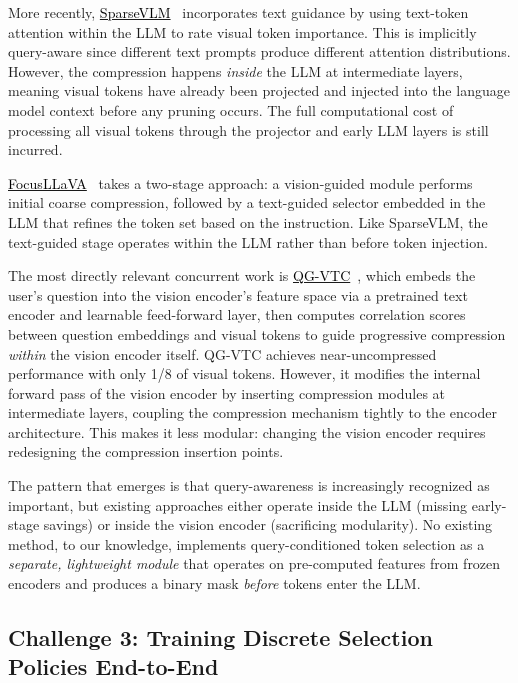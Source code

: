 \documentclass[11pt,twocolumn]{article}
\newcommand{\paperhref}[2]{\href{#1}{\textcolor{black}{#2}}}
\begin{document}
More recently, \paperhref{https://arxiv.org/abs/2504.00654}{SparseVLM}~\cite{zhang2025sparsevlm} incorporates text guidance by using text-token attention within the LLM to rate visual token importance. This is implicitly query-aware since different text prompts produce different attention distributions. However, the compression happens \emph{inside} the LLM at intermediate layers, meaning visual tokens have already been projected and injected into the language model context before any pruning occurs. The full computational cost of processing all visual tokens through the projector and early LLM layers is still incurred.

\paperhref{https://arxiv.org/abs/2401.08681}{FocusLLaVA}~\cite{zhu2024focusllava} takes a two-stage approach: a vision-guided module performs initial coarse compression, followed by a text-guided selector embedded in the LLM that refines the token set based on the instruction. Like SparseVLM, the text-guided stage operates within the LLM rather than before token injection.

The most directly relevant concurrent work is \paperhref{https://doi.org/10.1016/j.neucom.2025.127012}{QG-VTC}~\cite{li2025qgvtc}, which embeds the user's question into the vision encoder's feature space via a pretrained text encoder and learnable feed-forward layer, then computes correlation scores between question embeddings and visual tokens to guide progressive compression \emph{within} the vision encoder itself. QG-VTC achieves near-uncompressed performance with only 1/8 of visual tokens. However, it modifies the internal forward pass of the vision encoder by inserting compression modules at intermediate layers, coupling the compression mechanism tightly to the encoder architecture. This makes it less modular: changing the vision encoder requires redesigning the compression insertion points.

The pattern that emerges is that query-awareness is increasingly recognized as important, but existing approaches either operate inside the LLM (missing early-stage savings) or inside the vision encoder (sacrificing modularity). No existing method, to our knowledge, implements query-conditioned token selection as a \emph{separate, lightweight module} that operates on pre-computed features from frozen encoders and produces a binary mask \emph{before} tokens enter the LLM.

\subsection{Challenge 3: Training Discrete Selection Policies End-to-End}
\end{document}
